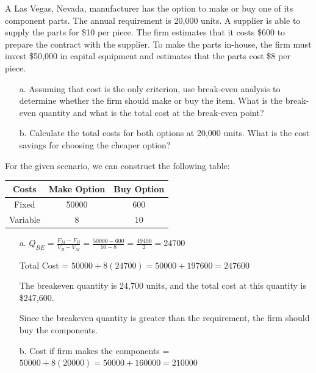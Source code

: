 \documentclass[addpoints]{exam}
\begin{document}
\begin{sloppypar}
\begin{questions}
    \pagebreak
    \question A Las Vegas, Nevada, manufacturer has the option to make or buy one of its component parts. The annual requirement is 20,000 units. A supplier is able to supply the parts for \$10 per piece. The firm estimates that it costs \$600 to prepare the contract with the supplier. To make the parts in-house, the firm must invest \$50,000 in capital equipment and estimates that the parts cost \$8 per piece.
    \begin{enumerate}
        \item[a.] Assuming that cost is the only criterion, use break-even analysis to determine whether the firm should make or buy the item. What is the break-even quantity and what is the total cost at the break-even point?
        \item[b.] Calculate the total costs for both options at 20,000 units. What is the cost savings for choosing the cheaper option?
    \end{enumerate}
    \begin{solution}
        For the given scenario, we can construct the following table:
        \begin{center}
            \begin{tabular}{|c|c|c|}
                \hline \textbf{Costs} & \textbf{Make Option} & \textbf{Buy Option} \\ \hline
                Fixed & 50000 & 600 \\ \hline
                Variable & 8 & 10 \\ \hline
            \end{tabular}
        \end{center}
        \begin{enumerate}
            \item[a.] $ Q_{BE} = \displaystyle\frac{F_M - F_B}{V_B - V_M} = \displaystyle\frac{50000 - 600}{10 - 8} = \displaystyle\frac{49400}{2} = 24700 $
                        
            Total Cost = $ 50000 + 8(24700) = 50000 + 197600 = 247600 $
            
            The breakeven quantity is 24,700 units, and the total cost at this quantity is \$247,600.

            Since the breakeven quantity is greater than the requirement, the firm should buy the components.


            \item[b.] Cost if firm makes the components = $ 50000 + 8(20000) = 50000 + 160000 = 210000 $
            

\end{enumerate}
\end{solution}
\end{questions}
\end{sloppypar}
\end{document}

